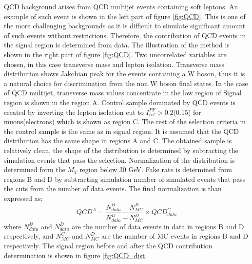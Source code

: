 QCD background arises from QCD multijet events containing soft leptons. An example of such event is shown in the left part of figure \ref{fig:QCD}. This is one of the more challenging backgrounds as it is difficult to simulate significant amount of such events without restrictions. Therefore, the contribution of QCD events in the signal region is determined from data. The illustration of the method is shown in the right part of figure \ref{fig:QCD}. Two uncorrelated variables are chosen, in this case transverse mass and lepton isolation. Transverse mass distribution shows Jakobian peak for the events containing a W boson, thus it is a natural choice for discrimination from the non W boson final states. In the case of QCD multijet, transverse mass values concentrate in the low region of  Signal region is shown in the region A. Control sample dominated by QCD events is created by inverting the lepton isolation cut to $I_{rel}^{PF}>0.2$($0.15$) for muons(electrons) which is shown as region C. The rest of the selection criteria in the control sample is the same as in signal region. It is assumed that the QCD distribution has the same shape in regions A and C. The obtained sample is relatively clean, the shape of the distribution is determined by subtracting the simulation events that pass the selection. Normalization of the distribution is determined form the $M_T$ region below 30 GeV. Fake rate is determined from regions B and D by subtracting simulation number of simulated events that pass the cuts from the number of data events. The final normalization is than expressed as:
\begin{equation}
QCD^A=\frac{N^B_{data}-N^B_{MC}}{N^D_{data}-N^D_{MC}}\times QCD^{C}_{data}
\end{equation}       
where $N^B_{data}$ and $N^D_{data}$ are the number of data events in data in regions B and D respectively, and $N^C_{MC}$ and $N^D_{MC}$ are the number of MC events in regions B and D respectively. The signal region before and after the QCD contribution determination is shown in figure \ref{fig:QCD_dist}.
